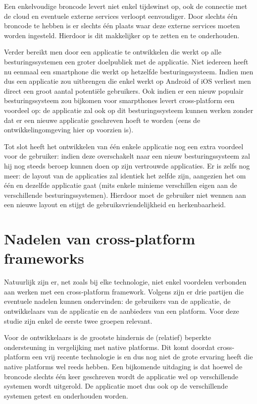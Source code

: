 Een enkelvoudige broncode levert niet enkel tijdswinst op, ook de connectie met de cloud en eventuele externe services verloopt eenvoudiger. Door slechts één broncode te hebben is er slechts één plaats waar deze externe services moeten worden ingesteld. Hierdoor is dit makkelijker op te zetten en te onderhouden.

Verder bereikt men door een applicatie te ontwikkelen die werkt op alle besturingssystemen een groter doelpubliek met de applicatie. Niet iedereen heeft nu eenmaal een smartphone die werkt op hetzelfde besturingssysteem. Indien men dus een applicatie zou uitbrengen die enkel werkt op Android of iOS verliest men direct een groot aantal potentiële gebruikers. Ook indien er een nieuw populair besturingssysteem zou bijkomen voor smarpthones levert cross-platform een voordeel op: de applicatie zal ook op dit besturingssysteem kunnen werken zonder dat er een nieuwe applicatie geschreven hoeft te worden (eens de ontwikkelingomgeving hier op voorzien is).

Tot slot heeft het ontwikkelen van één enkele applicatie nog een extra voordeel voor de gebruiker: indien deze overschakelt naar een nieuw besturingssysteem zal hij nog steeds beroep kunnen doen op zijn vertrouwde applicaties. Er is zelfs nog meer: de layout van de applicaties zal identiek het zelfde zijn, aangezien het om één en dezelfde applicatie gaat (mits enkele minieme verschillen eigen aan de verschillende besturingssystemen). Hierdoor moet de gebruiker niet wennen aan een nieuwe layout en stijgt de gebruiksvriendelijkheid en herkenbaarheid.

\section{Nadelen van cross-platform frameworks}

Natuurlijk zijn er, net zoals bij elke technologie, niet enkel voordelen verbonden aan werken met een cross-platform framework. Volgens \textcite{Corral2012} zijn er drie partijen die eventuele nadelen kunnen ondervinden: de gebruikers van de applicatie, de ontwikkelaars van de applicatie en de aanbieders van een platform. Voor deze studie zijn enkel de eerste twee groepen relevant.

Voor de ontwikkelaars is de grootste hindernis de (relatief) beperkte ondersteuning in vergelijking met native platforms. Dit komt doordat cross-platform een vrij recente technologie is en dus nog niet de grote ervaring heeft die native platforms wel reeds hebben. Een bijkomende uitdaging is dat hoewel de broncode slechts één keer geschreven wordt de applicatie wel op verschillende systemen wordt uitgerold. De applicatie moet dus ook op de verschillende systemen getest en onderhouden worden.

